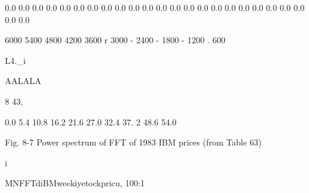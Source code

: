 0.0 0.0 0.0 0.0 0.0 0.0 0.0 0.0
0.0 0.0 0.0 0.0 0.0 0.0 0.0 0.0
0.0 0.0 0.0 0.0 0.0 0.0 0.0 0.0

 

 

 

 

 

6000
5400
4800
4200
3600
r 3000
- 2400
- 1800
- 1200
. 600

L4._i

AALALA

       

 

     

8 43,

0.0 5.4 10.8 16.2 21.6 27.0 32.4 37. 2 48.6 54.0

 

 

Fig. 8-7 Power spectrum of FFT of 1983 IBM prices (from Table 63)

i

 

 

MNFFTdiBMweekiyetockpricu, 100:1

 

 

 

 

 

 

 

